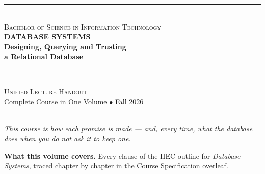 \thispagestyle{empty}

\begin{center}
\vspace*{1.0cm}

{\color{secondary}\rule{0.85\textwidth}{2pt}}\\[6pt]
{\large\textsc{\color{secondary}Bachelor of Science in Information Technology}}\\[18pt]

{\Huge\bfseries\color{primary}DATABASE SYSTEMS}\\[10pt]
{\LARGE\bfseries\color{primary}Designing, Querying and Trusting\\[4pt]a Relational Database}\\[16pt]

{\color{secondary}\rule{0.85\textwidth}{2pt}}\\[16pt]

{\Large\textsc{Unified Lecture Handout}}\\[6pt]
{\large\color{gray!70!black}Complete Course in One Volume $\bullet$ Fall 2026}\\[24pt]

\\[10pt]
{\small\itshape\color{gray!70!black}This course is how each promise is made
--- and, every time, what the database does when you do not ask it to keep
one.}

\vspace{1.0cm}

\begin{tcolorbox}[enhanced, width=0.86\textwidth, colback=lightbg,
  colframe=primary, boxrule=0pt, leftrule=4pt, arc=2pt, top=6pt, bottom=6pt]
\small
\textbf{\color{primary}What this volume covers.} Every clause of the HEC
outline for \emph{Database Systems}, traced chapter by chapter in the Course
Specification overleaf.


\end{tcolorbox}
\end{center}
